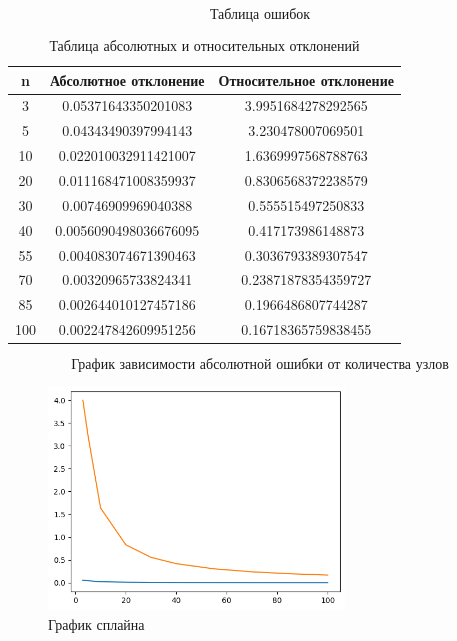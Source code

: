 \documentclass{article}
\begin{document}
$$\textbf{Таблица ошибок}$$
    \begin{table}[h!]
    \centering
    \begin{tabular}{|c|c|c|}
        \hline
        \textbf{n} & \textbf{Абсолютное отклонение} & \textbf{Относительное отклонение} \\
        \hline
        3   & 0.05371643350201083   & 3.9951684278292565  \\
        \hline
        5   & 0.04343490397994143   & 3.230478007069501   \\
        \hline
        10  & 0.022010032911421007  & 1.6369997568788763  \\
        \hline
        20  & 0.011168471008359937  & 0.8306568372238579  \\
        \hline
        30  & 0.00746909969040388   & 0.555515497250833   \\
        \hline
        40  & 0.0056090498036676095 & 0.417173986148873   \\
        \hline
        55  & 0.004083074671390463  & 0.3036793389307547  \\
        \hline
        70  & 0.00320965733824341   & 0.23871878354359727 \\
        \hline
        85  & 0.002644010127457186  & 0.1966486807744287  \\
        \hline
        100 & 0.002247842609951256  & 0.16718365759838455 \\
        \hline
    \end{tabular}
    \caption{Таблица абсолютных и относительных отклонений}
    \label{table:deviations}
    \end{table}

$$\textbf{График зависимости абсолютной ошибки от количества узлов}$$
\begin{figure}[H]
    \centering
    \includegraphics[width=0.7\textwidth]{lab_5_6_2.png}
    \caption{График сплайна}
    \label{fig:my_label}
\end{figure}
\end{document}
